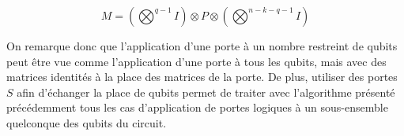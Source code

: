 $$M = \left(\bigotimes^{q-1} I\right) \otimes P \otimes \left(\bigotimes^{n-k-q-1} I\right)$$

On remarque donc que l'application d'une porte à un nombre restreint de qubits peut être vue comme l'application d'une porte à tous les qubits, mais avec des matrices identités à la place des matrices de la porte.
De plus, utiliser des portes $S$ afin d'échanger la place de qubits permet de traiter avec l'algorithme présenté précédemment tous les cas d'application de portes logiques à un sous-ensemble quelconque des qubits du circuit.
